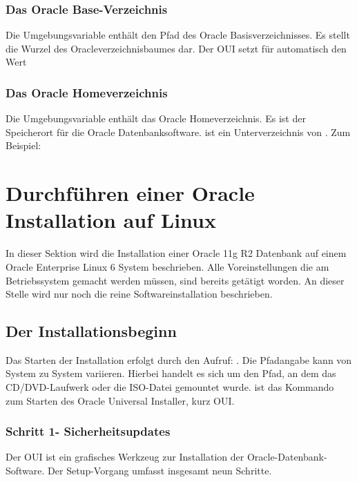         \subsubsection{Das Oracle Base-Verzeichnis}
          Die Umgebungsvariable  enth\"alt den Pfad des Oracle Basisverzeichnisses. Es stellt die Wurzel des Oracleverzeichnisbaumes dar. Der OUI setzt f\"ur  automatisch den Wert


        \subsubsection{Das Oracle Homeverzeichnis}
          Die Umgebungsvariable  enth\"alt das Oracle Homeverzeichnis. Es ist der Speicherort f\"ur die Oracle Datenbanksoftware.  ist ein Unterverzeichnis von . Zum Beispiel:


          \begin{literaturinternet}
            \item \cite{BABHAIIJ}
          \end{literaturinternet}

    \section{Durchf\"uhren einer Oracle Installation auf Linux}
      In dieser Sektion wird die Installation einer Oracle 11g R2 Datenbank auf einem Oracle Enterprise Linux 6 System beschrieben. Alle Voreinstellungen die am Betriebssystem gemacht werden m\"ussen, sind bereits get\"atigt worden. An dieser Stelle wird nur noch die reine Softwareinstallation beschrieben.
      \subsection{Der Installationsbeginn}
        Das Starten der Installation erfolgt durch den Aufruf: . Die Pfadangabe  kann von System zu System variieren. Hierbei handelt es sich um den Pfad, an dem das CD/DVD-Laufwerk oder die ISO-Datei gemountet wurde.  ist das Kommando zum Starten des Oracle Universal Installer, kurz OUI.
        \subsubsection{Schritt 1- Sicherheitsupdates}
          Der OUI ist ein grafisches Werkzeug zur Installation der Oracle-Datenbank-Software. Der Setup-Vorgang umfasst insgesamt neun Schritte.

